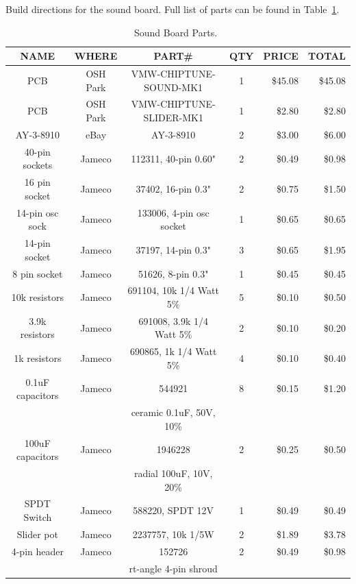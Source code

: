\documentclass[11pt]{article}
\begin{document}
Build directions for the sound board.
Full list of parts can be found in Table~\ref{table:sound_parts}.

\begin{table}[thp]
\caption{Sound Board Parts.~\label{table:sound_parts}}
\centering
\sf
\begin{tabular}{|c|c|c|c|r|r|}
\hline
NAME		& WHERE		& PART\#                  & QTY	& PRICE	   & TOTAL \\
\hline
\hline
PCB		& OSH Park	& VMW-CHIPTUNE-SOUND-MK1  & 1	& \$45.08  & \$45.08 \\
\hline
PCB		& OSH Park	& VMW-CHIPTUNE-SLIDER-MK1 & 1   &  \$2.80  &  \$2.80 \\
\hline
AY-3-8910	& eBay		& AY-3-8910		  & 2	&  \$3.00  &  \$6.00 \\
\hline
40-pin sockets	& Jameco	& 112311, 40-pin 0.60"    & 2	&  \$0.49  &  \$0.98 \\
\hline
16 pin socket	& Jameco	& 37402, 16-pin 0.3"      & 2	&  \$0.75  &  \$1.50 \\
\hline
14-pin osc sock	& Jameco	& 133006, 4-pin osc socket& 1	&  \$0.65  &  \$0.65 \\
\hline
14-pin socket	& Jameco	& 37197, 14-pin 0.3"      & 3	&  \$0.65  &  \$1.95 \\
\hline
8 pin socket	& Jameco	& 51626, 8-pin 0.3"       & 1	&  \$0.45  &  \$0.45 \\
\hline
10k resistors	& Jameco	& 691104, 10k 1/4 Watt 5\%& 5   &  \$0.10  &  \$0.50 \\
\hline
3.9k resistors	& Jameco	& 691008, 3.9k 1/4 Watt 5\%& 2   &  \$0.10  &  \$0.20 \\
\hline
1k resistors	& Jameco	& 690865, 1k 1/4 Watt 5\% & 4   &  \$0.10  &  \$0.40 \\
\hline
0.1uF capacitors& Jameco	& 544921		  & 8   &  \$0.15  &  \$1.20 \\
		&		& ceramic 0.1uF, 50V, 10\%&     &          &         \\
\hline
100uF capacitors& Jameco	& 1946228		  & 2   &  \$0.25  &  \$0.50 \\
		&		& radial 100uF, 10V, 20\% &     &          &         \\
\hline
SPDT Switch	& Jameco	& 588220, SPDT 12V	  & 1	&  \$0.49  &  \$0.49 \\
\hline
Slider pot	& Jameco	& 2237757, 10k 1/5W	  & 2	&  \$1.89  &  \$3.78 \\
\hline
4-pin header	& Jameco	& 152726		  & 2	&  \$0.49  &  \$0.98 \\
		&		& rt-angle 4-pin shroud	  &	&          &         \\

\end{tabular}
\end{table}
\end{document}

